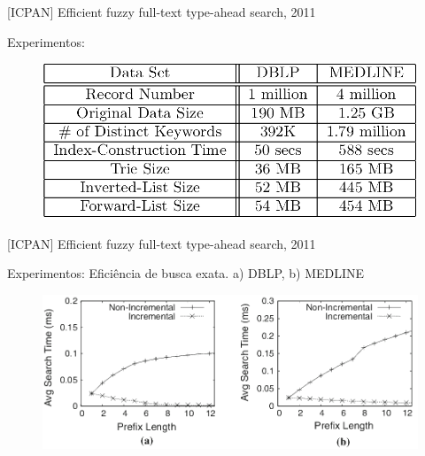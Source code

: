 \documentclass[11pt]{beamer}
\begin{document}
\begin{frame}{[ICPAN] Efficient fuzzy full-text type-ahead search, 2011}
    
    Experimentos:

    \begin{figure}
      \includegraphics[scale=0.33]{pictures/icpan_2_ex.png}
      \centering
    \end{figure}
    
\end{frame}

\begin{frame}{[ICPAN] Efficient fuzzy full-text type-ahead search, 2011}
    
    Experimentos: Eficiência de busca exata. a) DBLP, b) MEDLINE

    \begin{figure}
      \includegraphics[scale=0.33]{pictures/icpan_3_ex.png}
      \centering
    \end{figure}
    
\end{frame}
\end{document}
